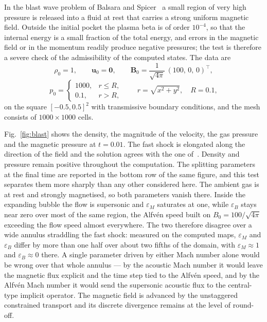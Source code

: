 \documentclass[a4paper,fleqn]{cas-sc}
\theoremstyle{remark}
\newcommand{\eps}{\varepsilon}
\newcommand{\epsM}{\eps_{M}}
\newcommand{\epsB}{\eps_{B}}
\begin{document}
In the blast wave problem of Balsara and Spicer~\cite{BalsaraSpicer1999} a
small region of very high pressure is released into a fluid at rest that
carries a strong uniform magnetic field. Outside the initial pocket the plasma
beta is of order $10^{-4}$, so that the internal energy is a small fraction of
the total energy, and errors in the magnetic field or in the momentum readily
produce negative pressures; the test is therefore a severe check of the
admissibility of the computed states. The data are
%
\begin{equation}
\label{eq:blast_ic1}
\rho_0 = 1, \qquad \mathbf{u}_0 = \mathbf{0},
\qquad
\mathbf{B}_0 = \frac{1}{\sqrt{4\pi}}\,(100,\,0,\,0)^{\!\top},
\end{equation}
%
\begin{equation}
\label{eq:blast_ic2}
p_0 =
\begin{cases}
1000, & r \le R, \\[2pt]
0.1, & r > R,
\end{cases}
\qquad r = \sqrt{x^2 + y^2},\quad R=0.1,
\end{equation}
%
on the square $[-0.5,0.5]^2$ with transmissive boundary conditions, and the
mesh consists of $1000 \times 1000$ cells.

Fig.~\ref{fig:blast} shows the density, the magnitude of the velocity, the gas
pressure and the magnetic pressure at $t=0.01$. The fast shock is elongated
along the direction of the field and the solution agrees with the one
of~\cite{BalsaraSpicer1999}.
Density and pressure remain positive throughout the computation.
The splitting parameters at the final time are reported in the bottom row of
the same figure, and this test separates them more sharply than any other
considered here. The ambient gas is at rest and strongly magnetised, so both
parameters vanish there. Inside the expanding bubble the flow is supersonic and
$\epsM$ saturates at one, while $\epsB$ stays near zero over most of the same
region, the Alfv\'en speed built on $B_0=100/\sqrt{4\pi}$ exceeding the flow
speed almost everywhere. The two therefore disagree over a wide annulus
straddling the fast shock: measured on the computed maps, $\epsM$ and $\epsB$
differ by more than one half over about two fifths of the domain, with
$\epsM\approx1$ and $\epsB\approx0$ there. A single parameter driven by either
Mach number alone would be wrong over that whole annulus --- by the acoustic
Mach number it would leave the magnetic flux explicit and the time step tied to
the Alfv\'en speed, and by the Alfv\'en Mach number it would send the
supersonic acoustic flux to the central-type implicit operator.
The magnetic field is advanced by the unstaggered constrained transport and
its discrete divergence remains at the level of round-off.
\end{document}

